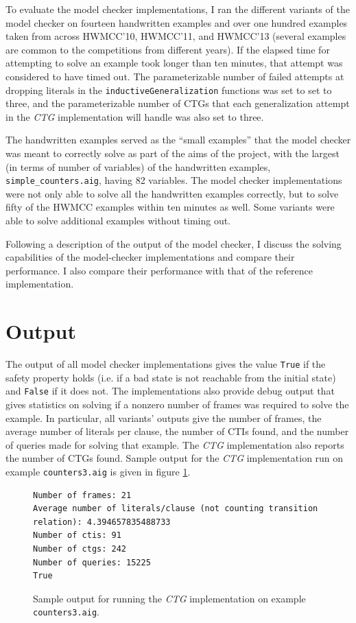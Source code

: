 \documentclass[12pt,a4paper,twoside,openright]{report}
\begin{document}
{To evaluate the model checker implementations, I ran the different variants of the model
checker on fourteen handwritten examples and over one hundred examples taken from
across HWMCC'10, HWMCC'11, and HWMCC'13
(several examples are common to the competitions from different years).
If the elapsed time for attempting to solve an example took longer than ten minutes, that
attempt was considered to have timed out. The parameterizable number of failed attempts
at dropping literals in the \verb,inductiveGeneralization, functions was set to set to
three, and the parameterizable number of CTGs that each generalization attempt
in the {\it CTG} implementation will handle was also set to three.

The handwritten examples served as the ``small examples'' that the model checker
was meant to correctly solve as part of the aims of the project, with the largest
(in terms of number of variables) of the handwritten examples,
\verb,simple_counters.aig,, having 82 variables. The model checker
implementations were not only able to solve all the handwritten examples correctly,
but to solve fifty of the HWMCC examples within ten minutes as well. Some
variants were able to solve additional examples without timing out.

Following a description of the output of the model checker,
I discuss the solving capabilities of the model-checker implementations and compare
their performance.
I also compare their performance with that of the reference implementation.


\section{Output}

The output of all model checker implementations gives the value \verb,True, if the safety
property holds (i.e. if a bad state is not reachable from the initial state) and
\verb,False, if it does not. The implementations also provide debug output that gives
statistics on solving if a nonzero number of frames was required to solve the example.
In particular, all variants' outputs give the number of frames, the average number of
literals per clause, the number of CTIs found, and the number of queries made for solving
that example. The {\it CTG} implementation also reports the number of CTGs found. Sample output
for the {\it CTG} implementation run on example \verb,counters3.aig,
is given in figure \ref{sampleoutput}.

\begin{figure}[!ht]
\centering
\begin{lstlisting}[keywordstyle = \ttfamily, basicstyle = \footnotesize\ttfamily]
Number of frames: 21
Average number of literals/clause (not counting transition relation): 4.394657835488733
Number of ctis: 91
Number of ctgs: 242
Number of queries: 15225
True
\end{lstlisting}
\caption{Sample output for running the {\it CTG} implementation on example {\tt counters3.aig}.}
\label{sampleoutput}
\end{figure}

}
\end{document}
